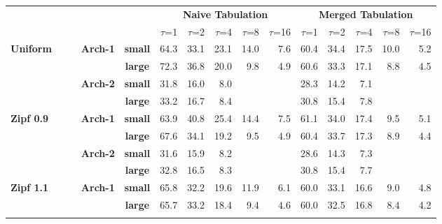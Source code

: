 \documentclass[10pt, conference, compsocconf]{IEEEtran}
\begin{document}
\begin{table}[htbp]
\centering
{\def\arraystretch{1.3}
\begin{tabular}{ccccc||rrrrr|rrrrr}  
                                 &&&&                 & \multicolumn{5}{c|}{\textbf{Naive Tabulation}} & \multicolumn{5}{c}{\textbf{Merged Tabulation}} \\
                                   &&&&                 & $\tau$=1   & $\tau$=2    & $\tau$=4    & $\tau$=8    & $\tau$=16  & $\tau$=1   & $\tau$=2   & $\tau$=4   & $\tau$=8   & $\tau$=16 \\ \hline
                                   
\multicolumn{1}{l}{\multirow{4}{*}{\textbf{Uniform}}}
&&&\multirow{2}{*}{\textbf{Arch-1}} & \textbf{small}  & 64.3    & 33.1   & 23.1   & 14.0   & 7.6   & 60.4    & 34.4    & 17.5   & 10.0   & 5.2   \\
&&&& \textbf{large} & 72.3    & 36.8   & 20.0   &   9.8 & 4.9   &  60.6 &	33.3 &	17.1	& 8.8	& 4.5 \\ \cline{2-15}

&&&\multirow{2}{*}{\textbf{Arch-2}} & \textbf{small}  & 31.8    & 16.0   & 8.0   &        &       &  28.3    &  14.2   & 7.1   &        &       \\
&&&& \textbf{large} &  33.2      &   16.7     &       8.4 &        &       &     30.8    &     15.4    &     7.8   &        &   \\ \hline  \hline
\multicolumn{1}{l}{\multirow{4}{*}{\textbf{Zipf 0.9}}}
&&&\multirow{2}{*}{\textbf{Arch-1}} & \textbf{small}  & 63.9    & 40.8   & 25.4   & 14.4   & 7.5   & 61.1    & 34.0    & 17.4   & 9.5   & 5.1   \\
                                 &&&& \textbf{large} & 67.6    & 34.1   & 19.2   &   9.5 & 4.9   &  60.4 &	33.7 &	17.3	& 8.9	& 4.4 \\ \cline{2-15}
             
&&&\multirow{2}{*}{\textbf{Arch-2}} & \textbf{small}  & 31.6    & 15.9   & 8.2   &        &       &  28.6    &  14.3   & 7.3   &        &       \\
                                 &&&& \textbf{large} &  32.8      &   16.5     &       8.3 &        &       &     30.8    &     15.4    &     7.7   &        &   \\ \hline  
\multicolumn{1}{l}{\multirow{4}{*}{\textbf{Zipf 1.1}}}
&&&\multirow{2}{*}{\textbf{Arch-1}} & \textbf{small}  & 65.8    & 32.2   & 19.6   & 11.9   & 6.1   & 60.0    & 33.1    & 16.6   & 9.0   & 4.8   \\
&&&& \textbf{large} & 65.7    & 33.2   & 18.4   &   9.4 & 4.6   &  60.0 &	32.5 &	16.8	& 8.4	& 4.2 \\ \cline{2-15}


\end{tabular}}
\end{table}
\end{document}
